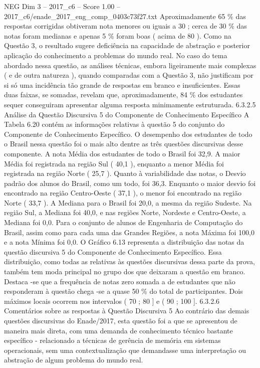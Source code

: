 \begin{textsample}{NEG Dim 3 – 2017\_c6 – Score 1.00 – 2017\_c6/enade\_2017\_eng\_comp\_0403c73f27.txt}
Aproximadamente 65 \% das respostas corrigidas obtiveram nota menores ou iguais a 30 ; cerca de 30 \% das notas foram medianas e apenas 5 \% foram boas ( acima de 80 ).
Como na Questão 3, o resultado sugere deficiência na capacidade de abstração e posterior aplicação do conhecimento a problemas do mundo real.
No caso do tema abordado nessa questão, as análises técnicas, embora ligeiramente mais complexas ( e de outra natureza ), quando comparadas com a Questão 3, não justificam por si só uma incidência tão grande de respostas em branco e insuficientes.
Essas duas faixas, se somadas, revelam que, aproximadamente, 84 \% dos estudantes sequer conseguiram apresentar alguma resposta minimamente estruturada. 6.3.2.5 Análise da Questão Discursiva 5 do Componente de Conhecimento Específico A Tabela 6.20 contém as informações relativas à questão 5 do conjunto do Componente de Conhecimento Específico.
O desempenho dos estudantes de todo o Brasil nessa questão foi o mais alto dentre as três questões discursivas desse componente.
A nota Média dos estudantes de todo o Brasil foi 32,9.
A maior Média foi registrada na região Sul ( 40,1 ), enquanto a menor Média foi registrada na região Norte ( 25,7 ).
Quanto à variabilidade das notas, o Desvio padrão dos alunos do Brasil, como um todo, foi 36,3.
Enquanto o maior desvio foi encontrado na região Centro-Oeste ( 37,1 ), o menor foi encontrado na região Norte ( 33,7 ).
A Mediana para o Brasil foi 20,0, a mesma da região Sudeste.
Na região Sul, a Mediana foi 40,0, e nas regiões Norte, Nordeste e Centro-Oeste, a Mediana foi 0,0.
Para o conjunto de alunos de Engenharia de Computação do Brasil, assim como para cada uma das Grandes Regiões, a nota Máxima foi 100,0 e a nota Mínima foi 0,0.
O Gráfico 6.13 representa a distribuição das notas da questão discursiva 5 do Componente de Conhecimento Específico.
Essa distribuição, como todas as relativas às questões discursivas dessa parte da prova, também tem moda principal no grupo dos que deixaram a questão em branco.
Destaca -se que a frequência de notas zero somada a de estudantes que não responderam à questão chega -se a quase 50 \% do total de participantes.
Dois máximos locais ocorrem nos intervalos ( 70 ; 80 ] e ( 90 ; 100 ]. 6.3.2.6 Comentários sobre as respostas à Questão Discursiva 5 Ao contrário das demais questões discursivas do Enade/2017, esta questão foi a que se apresentou de maneira mais direta, com uma demanda de conhecimento técnico bastante específico - relacionado a técnicas de gerência de memória em sistemas operacionais, sem uma contextualização que demandasse uma interpretação ou abstração de algum problema do mundo real.

\end{textsample}
